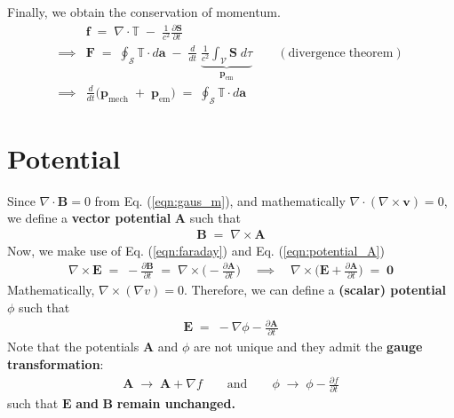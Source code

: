 \documentclass[12pt,a4paper]{article}
\begin{document}
Finally, we obtain the conservation of momentum.
\begin{align}
	&\mathbf{f} \; = \; 
	\nabla \cdot \mathbb{T} \; - \; 
	\frac{1}{c^{2}} \frac{\partial \mathbf{S}}{\partial t} \label{eqn:em_force_local} \\
	\implies &\mathbf{F} \; = \; 
	\oint_{\mathcal{S}} \mathbb{T} \cdot d\mathbf{a} 
	\; - \;
	\frac{d}{dt} \; \underbrace{\frac{1}{c^{2}} \int_{\mathcal{V}} \mathbf{S} \; d\tau}_{\mathbf{p}_{\mathrm{em}}} \qquad \mathrm{(divergence \; theorem)} \\
	\implies &\frac{d}{dt} \Big( \mathbf{p}_{\mathrm{mech}} \; + \; \mathbf{p}_{\mathrm{em}} \Big)
	 \; = \; 
	 \oint_{\mathcal{S}} \mathbb{T} \cdot d\mathbf{a}
\end{align}










\clearpage











\section{Potential}
Since $\nabla \cdot \mathbf{B} = 0$ from Eq. (\ref{eqn:gaus_m}), and mathematically $\nabla \cdot (\nabla \times \mathbf{v} ) = 0$, we define a \textbf{vector potential} $\mathbf{A}$ such that
\begin{align}
	\mathbf{B} \; = \; \nabla \times \mathbf{A} \label{eqn:potential_A}
\end{align}
Now, we make use of Eq. (\ref{eqn:faraday}) and Eq. (\ref{eqn:potential_A}) 
\begin{align}
	\nabla \times \mathbf{E} \; = \; - \frac{\partial \mathbf{B}}{\partial t}
	\; = \; \nabla \times \Big( -\frac{\partial \mathbf{\mathbf{A}}}{\partial t} \Big) 
	\quad \implies \quad 
	\nabla \times \Big( \mathbf{E} + \frac{\partial \mathbf{\mathbf{A}}}{\partial t} \Big) \; = \; \mathbf{0}
\end{align}
Mathematically, $\nabla \times (\nabla v) = 0$. Therefore, we can define a \textbf{(scalar) potential} $\phi$ such that
\begin{align}
	\mathbf{E} \; = \; - \nabla \phi - \frac{\partial \mathbf{A}}{\partial t} \label{eqn:potential_phi}
\end{align}
Note that the potentials $\mathbf{A}$ and $\phi$ are not unique and they admit the \textbf{gauge transformation}:
\begin{align}
	\mathbf{A} \; \to \; \mathbf{A} + \nabla f \qquad \mathrm{and} \qquad
	\phi \; \to \; \phi - \frac{\partial f}{\partial t}
\end{align}
such that $\mathbf{E}$ \textbf{and} $\mathbf{B}$ \textbf{remain  unchanged.}\\
\end{document}
